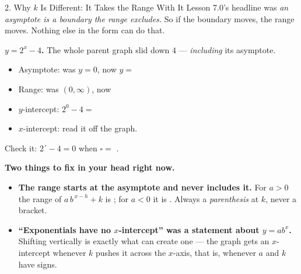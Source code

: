 \documentclass[10pt]{article}
\newcommand{\lgrid}[4]{%
  \draw[step=1, linegray!40, very thin] (#1,#3) grid (#2,#4);
  \draw[->, semithick, charcoal] (#1,0)--(#2,0) node[below right, font=\scriptsize]{$x$};
  \draw[->, semithick, charcoal] (0,#3)--(0,#4) node[left, font=\scriptsize]{$y$};}
\newcommand{\expgraph}[6]{\draw[very thick, forest, domain=#5:#6, samples=140, smooth]
  plot (\x,{(#1)*exp((#2)*((\x)-(#3)))+(#4)});}
\newcommand{\hasym}[3]{\draw[navy, dashed, semithick] (#1,#3)--(#2,#3);}
\begin{document}
\begin{notesbox}{2. Why $k$ Is Different: It Takes the Range With It}
Lesson 7.0's headline was \emph{an asymptote is a boundary the range excludes.} So if the boundary
moves, the range moves. Nothing else in the form can do that.
\begin{center}
\begin{minipage}[c]{0.44\linewidth}
\centering
{}
\end{minipage}
\begin{minipage}[c]{0.52\linewidth}
\small
\textbf{$y=2^{x}-4$.} The whole parent graph slid down $4$ --- \emph{including} its asymptote.
\begin{itemize}[leftmargin=1.3em, itemsep=3pt]
  \item Asymptote: was $y=0$, now $y=$ 
  \item Range: was $(0,\infty)$, now 
  \item $y$-intercept: $2^{0}-4=$ 
  \item $x$-intercept: read it off the graph. 
\end{itemize}
Check it: $2^{\,\square}-4=0$ when $\square=$ . \checkmark
\end{minipage}
\end{center}

\vspace{3pt}
\begin{tcolorbox}[colback=redbg, colframe=redacc, boxrule=0.8pt, arc=1.5mm,
    left=2.5mm, right=2.5mm, top=1.5mm, bottom=1.5mm]
\textbf{Two things to fix in your head right now.}
\begin{itemize}[leftmargin=1.4em, itemsep=2pt]
  \item \textbf{The range starts at the asymptote and never includes it.} For $a>0$ the range of
        $a\,b^{\,x-h}+k$ is ; for $a<0$ it is . Always a
        \emph{parenthesis} at $k$, never a bracket.
  \item \textbf{``Exponentials have no $x$-intercept'' was a statement about $y=ab^{x}$.} Shifting
        vertically is exactly what can create one --- the graph gets an $x$-intercept whenever $k$
        pushes it across the $x$-axis, that is, whenever $a$ and $k$ have  signs.
\end{itemize}
\end{tcolorbox}


\end{notesbox}
\end{document}

